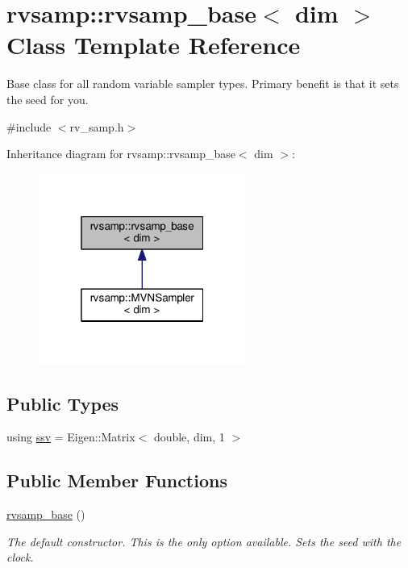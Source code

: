 \hypertarget{classrvsamp_1_1rvsamp__base}{}\section{rvsamp\+:\+:rvsamp\+\_\+base$<$ dim $>$ Class Template Reference}
\label{classrvsamp_1_1rvsamp__base}


Base class for all random variable sampler types. Primary benefit is that it sets the seed for you.  




{\ttfamily \#include $<$rv\+\_\+samp.\+h$>$}



Inheritance diagram for rvsamp\+:\+:rvsamp\+\_\+base$<$ dim $>$\+:\nopagebreak
\begin{figure}[H]
\begin{center}
\leavevmode
\includegraphics[width=193pt]{classrvsamp_1_1rvsamp__base__inherit__graph}
\end{center}
\end{figure}
\subsection*{Public Types}
\begin{DoxyCompactItemize}
\item 
using \hyperlink{classrvsamp_1_1rvsamp__base_a97f71542c6f1cd3bdf885039d5883580}{ssv} = Eigen\+::\+Matrix$<$ double, dim, 1 $>$
\end{DoxyCompactItemize}
\subsection*{Public Member Functions}
\begin{DoxyCompactItemize}
\item 
\hyperlink{classrvsamp_1_1rvsamp__base_a7733d1deae507d103e64ead7ca87e2ee}{rvsamp\+\_\+base} ()\hypertarget{classrvsamp_1_1rvsamp__base_a7733d1deae507d103e64ead7ca87e2ee}{}\label{classrvsamp_1_1rvsamp__base_a7733d1deae507d103e64ead7ca87e2ee}

\begin{DoxyCompactList}\small\item\em The default constructor. This is the only option available. Sets the seed with the clock. \end{DoxyCompactList}\end{DoxyCompactItemize}

